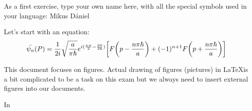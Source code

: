 \documentclass[12pt]{article}
\begin{document}
\par
As a first exercise, type your own name here, with all the special symbols used in your language: Mikus Dániel \par
Let's start with an equation:
\begin{equation}
    \Bar{\psi _n} (P) = \frac{1}{2i} \sqrt{\frac{a}{\pi \hbar}} e^{i(\frac{n \pi}{2} - \frac{pa}{2 \hbar})} \bigg[ F \bigg(p - \frac{n \pi \hbar}{a}\bigg) + (-1)^{n+1} F \bigg(p + \frac{n \pi \hbar}{a}\bigg) \bigg]
\end{equation}
\par
This document focuses on figures. Actual drawing of figures (pictures) in \LaTeX is a bit complicated to be a task on this exam but we always need to insert external figures into our documents.\par
In 
\end{document}
